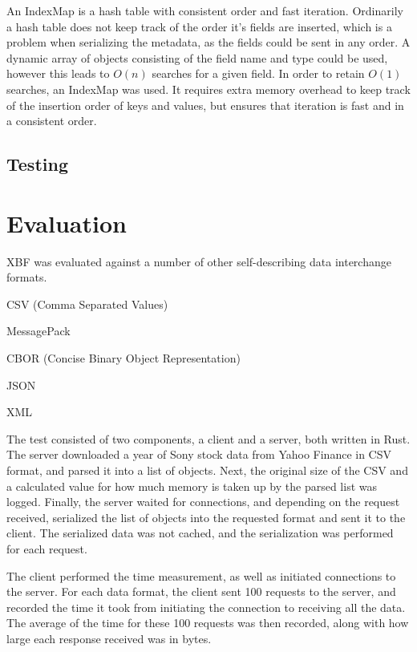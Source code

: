 \documentclass[conference]{IEEEtran}
\begin{document}
An IndexMap is a hash table with consistent order and fast iteration. Ordinarily a hash table does not keep track of the order it's fields are inserted, which is a problem when serializing the metadata, as the fields could be sent in any order. A dynamic array of objects consisting of the field name and type could be used, however this leads to $O(n)$ searches for a given field. In order to retain $O(1)$ searches, an IndexMap was used. It requires extra memory overhead to keep track of the insertion order of keys and values, but ensures that iteration is fast and in a consistent order.

\subsection{Testing}\label{testing}

\section{Evaluation}

XBF was evaluated against a number of other self-describing data interchange formats.

\begin{IEEEitemize}
	\item CSV (Comma Separated Values)\cite{csv_spec}\cite{csv_parser}
	\item MessagePack\cite{msgpack_spec}\cite{msgpack_parser}
	\item CBOR (Concise Binary Object Representation)\cite{cbor_spec}\cite{cbor_parser}
	\item JSON\cite{json_parser}
	\item XML\cite{xml_parser}
\end{IEEEitemize}

The test consisted of two components, a client and a server, both written in Rust. The server downloaded a year of Sony stock data from Yahoo Finance\cite{sony_stock_data} in CSV format, and parsed it into a list of objects. Next, the original size of the CSV and a calculated value for how much memory is taken up by the parsed list was logged. Finally, the server waited for connections, and depending on the request received, serialized the list of objects into the requested format and sent it to the client. The serialized data was not cached, and the serialization was performed for each request.

The client performed the time measurement, as well as initiated connections to the server. For each data format, the client sent 100 requests to the server, and recorded the time it took from initiating the connection to receiving all the data. The average of the time for these 100 requests was then recorded, along with how large each response received was in bytes.
\end{document}
